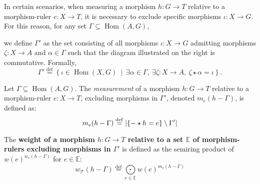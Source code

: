 In certain scenarios, when measuring a morphism $h :G\to T$ relative to a morphism-ruler $e:X \to T$, it is necessary to exclude specific morphisms $\iota :X \to G$. For this reason, for any set \( \Gamma \subseteq \operatorname{Hom}(A, G) \),

\noindent
\begin{minipage}{0.6\textwidth}
    we define $\Gamma'$ as the set consisting of all morphisms \( \iota : X \to G \) admitting morphisms \( \zeta \colon X \to A \) and \( \alpha \in \Gamma \) such that the diagram illustrated on the right is commutative. Formally,  
    \[
    \Gamma' \overset{\operatorname{def}}{=} \left\{ \iota \in \operatorname{Hom}(X, G)~\middle|~\exists \alpha \in \Gamma,~\exists \zeta:X \to A,~\zeta \star \alpha = \iota \right\}. 
    \]
\end{minipage}
\begin{minipage}{0.4\textwidth}
    \hfill 
\end{minipage}

\begin{definition}
    \label{def:weight_excluding_pre}
    Let \( \Gamma \subseteq \operatorname{Hom}(A, G) \).
    The \emph{measurement} of a morphism \( h:G \to T \) relative to a morphism-ruler \( e: X \to T \), excluding morphisms in \( \Gamma' \), denoted $m_e(h-\Gamma)$, is defined as:
    \[
        m_e(h-\Gamma) \overset{\operatorname{def}}{=} 
            |\{- \star h = e\} \setminus \Gamma'|
    \]
\end{definition}
\begin{definition}
    \label{def:weight_excluding}
    The \textbf{weight of a morphism $h: G \to T$ relative to a set $\mathbb{E}$ of morphism-rulers excluding morphisms in \( \Gamma' \)} is defined as the semiring product of $w(e)^{w_e(h-\Gamma)}$ for $e \in \mathbb{E}$:
    \[ 
        w_\mathcal{T}(h-\Gamma) \overset{\operatorname{def}}{=} \underset{e \in \mathbb{E}}{\bigodot} 
    w(e)^{m_e(h-\Gamma)}
            \]
\end{definition}
